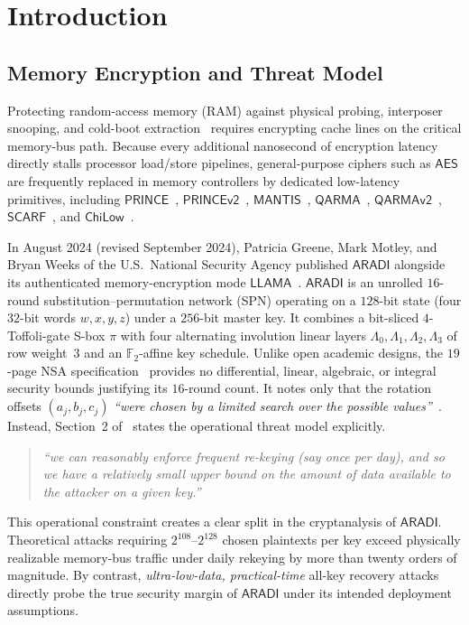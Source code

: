 \documentclass[11pt,a4paper]{article}
\theoremstyle{definition}
\theoremstyle{remark}
\newcommand{\Ftwo}{\mathbb{F}_2}
\newcommand{\ARADI}{\mathsf{ARADI}}
\newcommand{\LLAMA}{\mathsf{LLAMA}}
\begin{document}
\section{Introduction}

\subsection{Memory Encryption and Threat Model}
Protecting random-access memory (RAM) against physical probing, interposer snooping, and cold-boot extraction~\cite{HSH08} requires encrypting cache lines on the critical memory-bus path. Because every additional nanosecond of encryption latency directly stalls processor load/store pipelines, general-purpose ciphers such as $\mathsf{AES}$ are frequently replaced in memory controllers by dedicated low-latency primitives, including $\mathsf{PRINCE}$~\cite{BCG12}, $\mathsf{PRINCEv2}$~\cite{BEK20}, $\mathsf{MANTIS}$~\cite{BJK16}, $\mathsf{QARMA}$~\cite{Ava17}, $\mathsf{QARMAv2}$~\cite{ABD23}, $\mathsf{SCARF}$~\cite{CGL23}, and $\mathsf{ChiLow}$~\cite{BDG25}.

In August 2024 (revised September 2024), Patricia Greene, Mark Motley, and Bryan Weeks of the U.S.\ National Security Agency published $\ARADI$ alongside its authenticated memory-encryption mode $\LLAMA$~\cite{GMW24}. $\ARADI$ is an unrolled $16$-round substitution--permutation network (SPN) operating on a $128$-bit state (four $32$-bit words $w, x, y, z$) under a $256$-bit master key. It combines a bit-sliced $4$-Toffoli-gate S-box $\pi$ with four alternating involution linear layers $\Lambda_0, \Lambda_1, \Lambda_2, \Lambda_3$ of row weight~$3$ and an $\Ftwo$-affine key schedule. Unlike open academic designs, the $19$-page NSA specification~\cite{GMW24} provides no differential, linear, algebraic, or integral security bounds justifying its $16$-round count. It notes only that the rotation offsets $(a_j, b_j, c_j)$ \emph{``were chosen by a limited search over the possible values''}~\cite[Section~3.1, p.~5]{GMW24}. Instead, Section~2 of~\cite[p.~2]{GMW24} states the operational threat model explicitly.
\begin{quote}
\emph{``we can reasonably enforce frequent re-keying (say once per day), and so we have a relatively small upper bound on the amount of data available to the attacker on a given key.''}
\end{quote}
This operational constraint creates a clear split in the cryptanalysis of $\ARADI$. Theoretical attacks requiring $2^{108}$--$2^{128}$ chosen plaintexts per key exceed physically realizable memory-bus traffic under daily rekeying by more than twenty orders of magnitude. By contrast, \emph{ultra-low-data, practical-time} all-key recovery attacks directly probe the true security margin of $\ARADI$ under its intended deployment assumptions.
\end{document}
